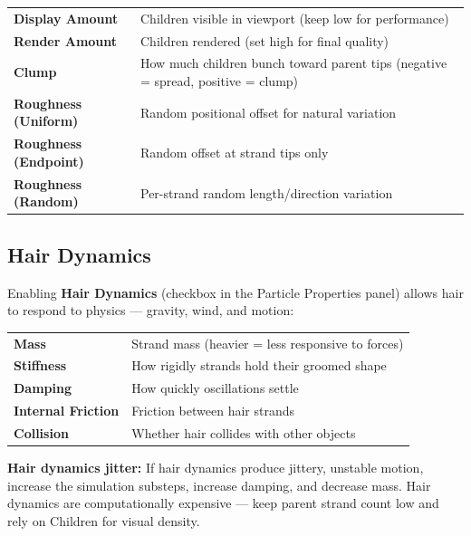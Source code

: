 \begin{center}
\begin{tabularx}{\textwidth}{L{3.5cm}X}
\toprule
{}
 &  \\
\midrule
\textbf{Display Amount} & Children visible in viewport (keep low for performance) \\
\textbf{Render Amount} & Children rendered (set high for final quality) \\
\textbf{Clump} & How much children bunch toward parent tips (negative = spread, positive = clump) \\
\textbf{Roughness (Uniform)} & Random positional offset for natural variation \\
\textbf{Roughness (Endpoint)} & Random offset at strand tips only \\
\textbf{Roughness (Random)} & Per-strand random length/direction variation \\
\bottomrule
\end{tabularx}
\end{center}

\subsection{Hair Dynamics}

Enabling \textbf{Hair Dynamics} (checkbox in the Particle Properties panel) allows hair to respond to physics --- gravity, wind, and motion:

\begin{center}
\begin{tabularx}{\textwidth}{L{3cm}X}
\toprule
{}
 &  \\
\midrule
\textbf{Mass} & Strand mass (heavier = less responsive to forces) \\
\textbf{Stiffness} & How rigidly strands hold their groomed shape \\
\textbf{Damping} & How quickly oscillations settle \\
\textbf{Internal Friction} & Friction between hair strands \\
\textbf{Collision} & Whether hair collides with other objects \\
\bottomrule
\end{tabularx}
\end{center}

\begin{warningbox}
\textbf{Hair dynamics jitter:} If hair dynamics produce jittery, unstable motion, increase the simulation substeps, increase damping, and decrease mass. Hair dynamics are computationally expensive --- keep parent strand count low and rely on Children for visual density.
\end{warningbox}

